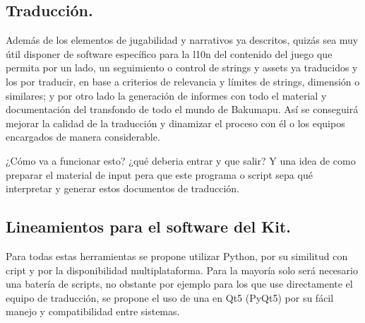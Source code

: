 \subsection{Traducción.}\label{kit:traduccion}
Además de los elementos de jugabilidad y narrativos ya descritos, quizás sea muy útil disponer de software específico para la l10n del contenido del juego que permita por un lado, un seguimiento o control de strings y assets ya traducidos y los por traducir, en base a criterios de relevancia y límites de strings, dimensión o similares; y por otro lado la generación de informes con todo el material y documentación del transfondo de todo el mundo de Bakumapu. Así se conseguirá mejorar la calidad de la traducción y dinamizar el proceso con él o los equipos encargados de manera considerable.

 ¿Cómo va a funcionar esto? ¿qué deberia entrar y que salir? Y una idea de como preparar el material de input pera que este programa o script sepa qué interpretar y generar estos documentos de traducción.

\subsection{Lineamientos para el software del Kit.}\label{kit:lineamientos-software-kit}
Para todas estas herramientas se propone utilizar Python, por su similitud con cript y por la disponibilidad multiplataforma. Para la mayoría solo será necesario una batería de scripts, no obstante por ejemplo para los que use directamente el equipo de traducción, se propone el uso de una  en Qt5 (PyQt5) por su fácil manejo y compatibilidad entre sistemas.
